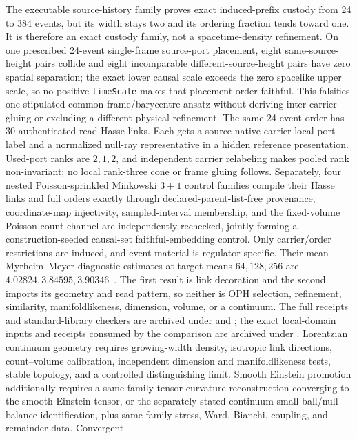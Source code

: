 \documentclass[11pt]{article}
\theoremstyle{remark}
\theoremstyle{plain}
\begin{document}
The executable source-history family proves exact induced-prefix custody
from 24 to 384 events, but its width stays two and its ordering fraction tends
toward one. It is therefore an exact custody family, not a spacetime-density
refinement. On one prescribed 24-event single-frame source-port placement, eight same-source-height
pairs collide and eight incomparable different-source-height pairs have zero spatial
separation; the exact lower causal scale exceeds the zero spacelike upper
scale, so no positive \texttt{timeScale} makes that placement order-faithful. This falsifies
one stipulated common-frame/barycentre ansatz without deriving inter-carrier
gluing or excluding a different physical refinement.
The same 24-event order has 30 authenticated-read Hasse links. Each gets a
source-native carrier-local port label and a normalized null-ray representative
in a hidden reference presentation. Used-port ranks are \(2,1,2\), and
independent carrier relabeling makes pooled rank non-invariant; no local
rank-three cone or frame gluing follows. Separately,
four nested Poisson-sprinkled Minkowski \(3+1\) control families compile their
Hasse links and full orders exactly through declared-parent-list-free provenance;
coordinate-map injectivity, sampled-interval membership, and the fixed-volume
Poisson count channel are independently rechecked, jointly forming a
construction-seeded causal-set faithful-embedding control. Only carrier/order
restrictions are induced, and event material is regulator-specific. Their mean Myrheim--Meyer diagnostic estimates
at target means \(64,128,256\) are \(4.02824,3.84595,3.90346\)~\cite{ReidMyrheimMeyer}. The first
result is link decoration and the second imports its geometry and read pattern,
so neither is OPH selection, refinement, similarity, manifoldlikeness,
dimension, volume, or a continuum.
The full receipts and standard-library checkers are archived under
 and
; the exact local-domain inputs and receipts
consumed by the comparison are archived under .
Lorentzian continuum geometry requires growing-width density, isotropic link
directions, count--volume calibration, independent dimension and
manifoldlikeness tests, stable topology, and a controlled distinguishing
limit. Smooth Einstein promotion additionally requires a same-family
tensor-curvature reconstruction converging to the smooth Einstein tensor, or
the separately stated continuum small-ball/null-balance identification, plus
same-family stress, Ward, Bianchi, coupling, and remainder data. Convergent
\end{document}
